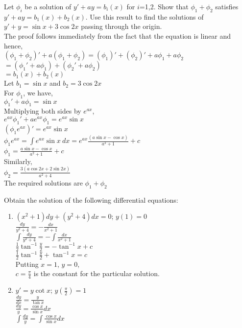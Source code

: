 \documentclass[a4paper]{article}
\begin{document}
\begin{enumerate}
{\item{Let $\phi_i$ be a solution of $y' +ay=b_i(x)$ for $i$=1,2. Show that $\phi_1+\phi_2$ satisfies $y' +ay=b_1(x)+b_2(x)$. Use this result to find the solutions of $y'+y=\sin x+ 3\cos 2x$ passing through the origin.
\\The proof follows immediately from the fact that the equation is linear and hence,
\\$(\phi_1+\phi_2)'+a(\phi_1+\phi_2)=(\phi_1)'+(\phi_2)' + a\phi_1+a\phi_2$
\\$=(\phi_1'+ a\phi_1) +(\phi_2' +a\phi_2)$
\\$=b_1(x)+b_2(x)$
\\Let $b_1=\sin x$ and $b_2=3\cos 2x$
\\For $\phi_1$, we have,
\\$\phi_1' + a\phi_1=\sin x$
\\Multiplying both sides by $e^{ax}$,
\\$e^{ax}\phi_1' + ae^{ax}\phi_1=e^{ax}\sin x$
\\$(\phi_1e^{ax})'=e^{ax}\sin x$
\\$\phi_1e^{ax}=\int e^{ax}\sin x \ dx=e^{ax}\frac{(a\sin x - \cos x)}{a^2+1} +c$
\\$\phi_1=\frac{a\sin x - \cos x}{a^2+1} +c$
\\Similarly,
\\$\phi_2=\frac{3(a\cos 2x+2\sin 2x)}{a^2+4}$
\\The required solutions are $\phi_1+\phi_2$
}
}
\item{Obtain the solution of the following differential equations:
\begin{enumerate}
\item{$(x^2+1)dy+(y^2+4)dx=0$; $y(1)=0$
\\$\frac{dy}{y^2+4}=-\frac{dx}{x^2+1}$
\\$\int\frac{dy}{y^2+4}=-\int\frac{dx}{x^2+1}$
\\$\frac{1}{2}\tan^{-1}{\frac{y}{2}}=-\tan^{-1}{x}+c$
\\$\frac{1}{2}\tan^{-1}{\frac{y}{2}}+\tan^{-1}{x}=c$
\\Putting $x=1$, $y=0$,
\\$c=\frac{\pi}{4}$ is the constant for the particular solution.
}
\item{$y'=y\cot x$; $y(\frac{\pi}{2})=1$
\\$\frac{dy}{dx}=\frac{y}{\tan x}$
\\$\frac{dy}{y}=\frac{\cos x}{\sin x}dx$
\\$\int\frac{dy}{y}=\int\frac{\cos x}{\sin x}dx$
}
\end{enumerate}}
\end{enumerate}
\end{document}
